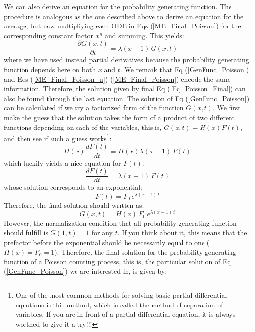 We can also derive an equation for the probability generating function. The procedure is analogous as the one described above to derive an equation for the average, but now multipliying each ODE in Eqs (\ref{ME_Final_Poisson}) for the corresponding constant factor $x^n$ and summing. This yields:
\begin{equation}
    \frac{\partial G(x,t)}{\partial t} = \lambda(x-1)\,G(x,t)
    \label{GenFunc_Poisson}
\end{equation}
where we have used instead partial derivatives because the probability generating function depends here on both $x$ and $t$.  We remark that Eq (\ref{GenFunc_Poisson}) and Eqs (\ref{ME_Final_Poisson_n})-(\ref{ME_Final_Poisson}) encode the same information. Therefore, the solution given by final Eq (\ref{Eq_Poisson_Final}) can also be found through the last equation. The solution of Eq (\ref{GenFunc_Poisson}) can be calculated if we try a factorized form of the function $G(x,t)$. We first make the guess that the solution takes the form of a product of two different functions depending on each of the variables, this is, $G(x,t)=H(x)F(t)$, and then see if such a guess works\footnote{One of the most common methods for solving basic partial differential equations is this method, which is called the method of separation of variables. If you are in front of a partial differential equation, it is always worthed to give it a try!!!}:
\begin{equation}
    H(x) \frac{dF(t)}{dt} = H(x) \lambda(x-1)\,F(t)
\end{equation}
which luckily yields a nice equation for $F(t)$:
\begin{equation}
    \frac{dF(t)}{dt} = \lambda(x-1)\,F(t)
\end{equation}
whose solution corresponds to an exponential:
\begin{equation}
    F(t)= F_0\,e^{\lambda(x-1)\,t}
\end{equation}
Therefore, the final solution should written as:
\begin{equation}
    G(x, t)= H(x)\,F_0\,e^{\lambda(x-1)\,t}
\end{equation}
However, the normalization condition that all probability generating function should fulfill is $G(1,t)=1$ for any $t$. If you think about it, this means that the prefactor before the exponential should be necessarily equal to one ($H(x)=F_0=1$). Therefore, the final solution for the probability generating function of a Poisson counting process, this is, the particular solution of Eq (\ref{GenFunc_Poisson}) we are interested in, is given by: 
